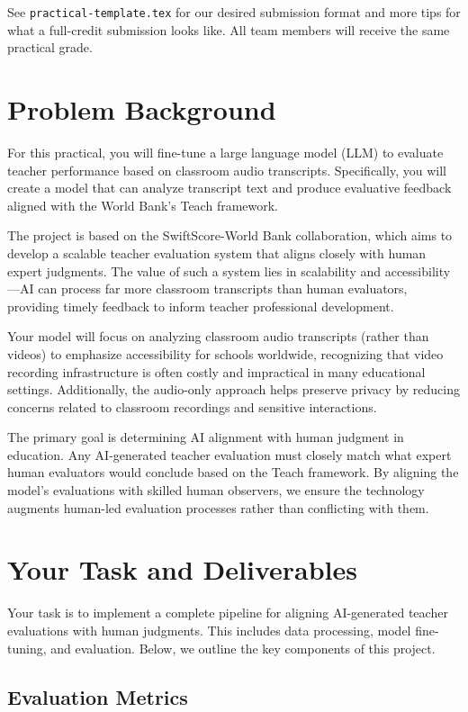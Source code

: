 \documentclass[11pt]{article}
\begin{document}
See \texttt{practical-template.tex} for our desired submission format and more tips for what a full-credit submission looks like. All team members will receive the same practical grade.

\section{Problem Background}

For this practical, you will fine-tune a large language model (LLM) to evaluate teacher performance based on classroom audio transcripts. Specifically, you will create a model that can analyze transcript text and produce evaluative feedback aligned with the World Bank's Teach framework.

The project is based on the SwiftScore-World Bank collaboration, which aims to develop a scalable teacher evaluation system that aligns closely with human expert judgments. The value of such a system lies in scalability and accessibility—AI can process far more classroom transcripts than human evaluators, providing timely feedback to inform teacher professional development.

Your model will focus on analyzing classroom audio transcripts (rather than videos) to emphasize accessibility for schools worldwide, recognizing that video recording infrastructure is often costly and impractical in many educational settings. Additionally, the audio-only approach helps preserve privacy by reducing concerns related to classroom recordings and sensitive interactions.

The primary goal is determining AI alignment with human judgment in education. Any AI-generated teacher evaluation must closely match what expert human evaluators would conclude based on the Teach framework. By aligning the model's evaluations with skilled human observers, we ensure the technology augments human-led evaluation processes rather than conflicting with them.

\section{Your Task and Deliverables}

Your task is to implement a complete pipeline for aligning AI-generated teacher evaluations with human judgments. This includes data processing, model fine-tuning, and evaluation. Below, we outline the key components of this project.

\subsection{Evaluation Metrics}
\end{document}
